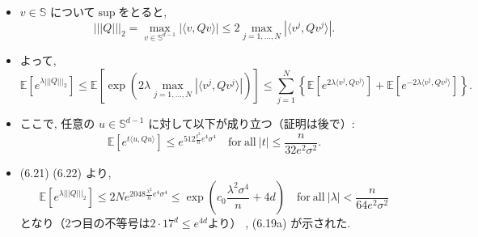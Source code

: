 \documentclass[unicode,aspectratio=169,11pt]{beamer}
\newcommand{\ex}{\mathbb{E}}
\newcommand{\bb}{\mathbb}
\begin{document}
\begin{frame}
  \begin{itemize}
    \item $v \in \bb{S}$ について$\sup$をとると,
            \[ |||Q|||_2 = \max_{v \in \bb{S}^{d-1}} |\langle v, Qv\rangle| \le 2 \max_{j = 1,\dots,N} |\langle v^j, Qv^j\rangle|. \]
    \item よって,
            {\small
            \[
                \ex\left[e^{\lambda|||Q|||_2}\right]
                \le \ex\left[\exp\left( 2\lambda\max_{j=1,\dots,N}|\langle v^j, Qv^j \rangle| \right)\right]
                \le \sum_{j=1}^N\left\{ \ex\left[e^{2\lambda\langle v^j, Qv^j\rangle}\right] + \ex\left[e^{-2\lambda\langle v^j, Qv^j\rangle}\right] \right\}.
                \tag{6.21}
            \]}
    \item ここで, 任意の $u \in \bb{S}^{d-1}$ に対して以下が成り立つ（証明は後で）:
            \[
              \ex\left[ e^{t \langle u, Qu \rangle} \right] \le e^{512 \frac{t^2}{n} e^4 \sigma^4} 
              \quad \mathrm{for\ all}\ |t| \le \frac{n}{32 e^2 \sigma^2}.
              \tag{6.22}
            \]
    \item (6.21) (6.22) より,
            \[
                \ex\left[e^{\lambda |||Q|||_2}\right] \le 2Ne^{2048 \frac{\lambda^2}{n}e^4 \sigma^4} \le \exp\left(c_0 \frac{\lambda^2\sigma^4}{n}+4d\right)
                \quad \mathrm{for\ all}\ |\lambda| < \frac{n}{64 e^2 \sigma^2}
            \]
            となり（2つ目の不等号は$2\cdot 17^d \le e^{4d}$より） , (6.19a) が示された.
  \end{itemize}
\end{frame}
\end{document}
